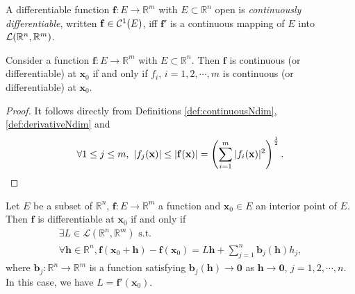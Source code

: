 \begin{defn}
  \label{def:C1VecFunc}
  A differentiable function $\mathbf{f}: E\rightarrow \mathbb{R}^m$
  with $E\subset \mathbb{R}^n$ open
  is \emph{continuously differentiable},
  written $\mathbf{f}\in{\cal C}^1(E)$, 
  iff $\mathbf{f}'$ is a continuous mapping of $E$
  into ${\cal L}(\mathbb{R}^n,\mathbb{R}^m)$.
\end{defn}

\begin{lem}
  \label{lem:FuncEquvItsComponent}
  Consider a function $\mathbf{f}:E\rightarrow \mathbb{R}^{m}$ with
  $E\subset \mathbb{R}^{n}$. Then $\mathbf{f}$ is
  continuous (or differentiable) at $\mathbf{x}_{0}$ if and only if
  $f_{i}$, $i=1,2,\cdots,m$ is continuous (or differentiable)
  at $\mathbf{x}_{0}$.
\end{lem}
\begin{proof}
  It follows directly from Definitions
  \ref{def:continuousNdim}, \ref{def:derivativeNdim} and
  \begin{displaymath}
    \forall 1\le j\le m,\
    |f_{j}(\mathbf{x})|\le|\mathbf{f}(\mathbf{x})|
    =\left(\sum_{i=1}^{m}|f_{i}(\mathbf{x})|^{2}\right)^{\frac{1}{2}}
    .\qedhere
  \end{displaymath}
\end{proof}

\begin{thm}
  \label{thm:equivDefOfDifferentiability}
  Let $E$ be a subset of $\mathbb{R}^{n}$,
  $\mathbf{f}:E\rightarrow \mathbb{R}^{m}$ a function 
  and $\mathbf{x}_{0}\in E$ an interior point of $E$.
  Then $\mathbf{f}$ is differentiable at $\mathbf{x}_{0}$
  if and only if
  \begin{equation}
    \label{eq:equivDefOfDifferentiability}
    \begin{array}{l}
      \exists L\in \mathcal{L}(\mathbb{R}^{n},\mathbb{R}^{m})
      \text{ s.t. }\\
      \forall \mathbf{h}\in \mathbb{R}^{n},
      \mathbf{f}(\mathbf{x}_{0}+\mathbf{h})-\mathbf{f}(\mathbf{x}_{0})
      =L\mathbf{h}
      +\sum_{j=1}^{n}\mathbf{b}_{j}(\mathbf{h})h_{j},
    \end{array}
  \end{equation}
  where $\mathbf{b}_{j}: \mathbb{R}^{n}\rightarrow \mathbb{R}^{m}$
  is a function satisfying
  $\mathbf{b}_{j}(\mathbf{h})\rightarrow \mathbf{0}$ as
  $\mathbf{h}\rightarrow \mathbf{0}$, $j=1,2,\cdots,n$.
  In this case, we have $L=\mathbf{f}'(\mathbf{x}_{0})$.
\end{thm}

